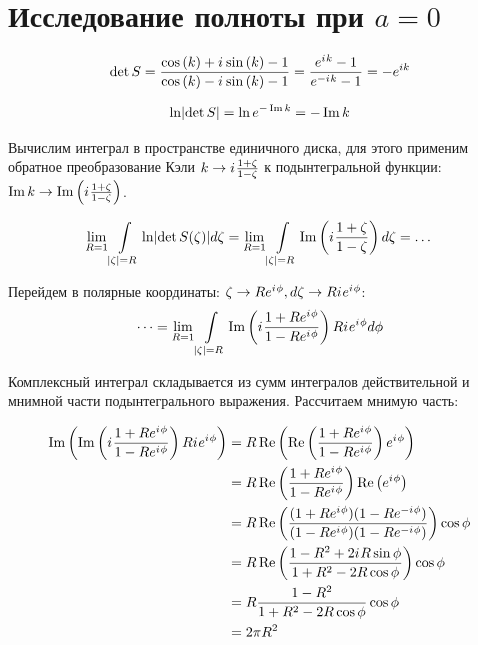 \documentclass{nsart_eng}
\DeclarePairedDelimiter{\abs}{\lvert}{\rvert}
\newcommand{\eexp}[1]{e^{#1}}
\newcommand{\iu}{{i\mkern1mu}}
\renewcommand{\Re}{\operatorname{Re}}
\renewcommand{\Im}{\operatorname{Im}}
\begin{document}
\section{Исследование полноты при $a=0$}
\[
\det S
= \frac
{\cos\left(k\right) + \iu \sin\left(k\right) - 1}
{\cos\left(k\right) - \iu \sin\left(k\right) - 1}
= \frac{\eexp{\iu k} - 1}{\eexp{-\iu k} - 1}
= -\eexp{i k}
\]

\[
\ln \abs{\det S} = \ln \eexp{- \Im k} = -\Im k
\]


Вычислим интеграл в пространстве единичного диска, для этого применим обратное преобразование Кэли $k \to \iu \frac{1 + \zeta}{1 - \zeta}$ к подынтегральной функции: $\Im k \to \Im \left( \iu \frac{1 + \zeta}{1 - \zeta} \right) $.

\[
  \lim\limits_{R = 1} \int\limits_{\abs{\zeta} = R} \ln \abs{\det S(\zeta)} d \zeta
= \lim\limits_{R = 1} \int\limits_{\abs{\zeta} = R} \Im \left( \iu \frac{1 + \zeta}{1 - \zeta} \right)  d\zeta = \dots
\]

Перейдем в полярные координаты: $\zeta \to R \eexp{\iu \phi}, d\zeta \to R \iu \eexp{\iu \phi}$:
\[
\dots = \lim\limits_{R = 1} \int\limits_{\abs{\zeta} = R} \Im \left( \iu \frac{1 + R \eexp{\iu \phi}}{1 - R \eexp{\iu \phi}} \right) R \iu \eexp{\iu \phi} d\phi
\]


Комплексный интеграл складывается из сумм интегралов действительной и мнимной части подынтегрального выражения. Рассчитаем мнимую часть:

\begin{align*}
\Im \left(  \Im \left( \iu \frac{1 + R \eexp{\iu \phi}}{1 - R \eexp{\iu \phi}} \right) R \iu \eexp{\iu \phi} \right)
 &= R \Re \left(  \Re \left( \frac{1 + R \eexp{\iu \phi}}{1 - R \eexp{\iu \phi}} \right) \eexp{\iu \phi} \right) \\
 &= R \Re \left( \frac{1 + R \eexp{\iu \phi}}{1 - R \eexp{\iu \phi}} \right) \Re \left(   \eexp{\iu \phi} \right) \\
 &= R \Re \left( \frac{(1 + R \eexp{\iu \phi}) (1 - R \eexp{-\iu \phi}) }{(1 - R \eexp{\iu \phi}) (1 - R \eexp{-\iu \phi})} \right) \cos \phi \\
 &= R \Re \left( \frac{1 - R^2 + 2 \iu R \sin \phi}{1 + R^2 - 2 R \cos \phi} \right) \cos \phi \\
 &= R \frac{1 - R^2}{1 + R^2 - 2 R \cos \phi} \cos \phi \\
 &= 2 \pi R^2
\end{align*}
\end{document}
